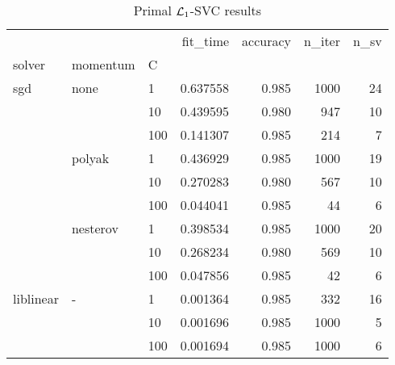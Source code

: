 \begin{table}[H]
\centering
\caption{Primal $\protect \mathcal{L}_1$-SVC results}
\label{primal_l1_svc_cv_results}
\begin{tabular}{lllrrrr}
\toprule
          &   &     &  fit\_time &  accuracy &  n\_iter &  n\_sv \\
solver & momentum & C &           &           &         &       \\
\midrule
sgd & none & 1   &  0.637558 &     0.985 &    1000 &    24 \\
          &   & 10  &  0.439595 &     0.980 &     947 &    10 \\
          &   & 100 &  0.141307 &     0.985 &     214 &     7 \\
          & polyak & 1   &  0.436929 &     0.985 &    1000 &    19 \\
          &   & 10  &  0.270283 &     0.980 &     567 &    10 \\
          &   & 100 &  0.044041 &     0.985 &      44 &     6 \\
          & nesterov & 1   &  0.398534 &     0.985 &    1000 &    20 \\
          &   & 10  &  0.268234 &     0.980 &     569 &    10 \\
          &   & 100 &  0.047856 &     0.985 &      42 &     6 \\
liblinear & - & 1   &  0.001364 &     0.985 &     332 &    16 \\
          &   & 10  &  0.001696 &     0.985 &    1000 &     5 \\
          &   & 100 &  0.001694 &     0.985 &    1000 &     6 \\
\bottomrule
\end{tabular}
\end{table}
